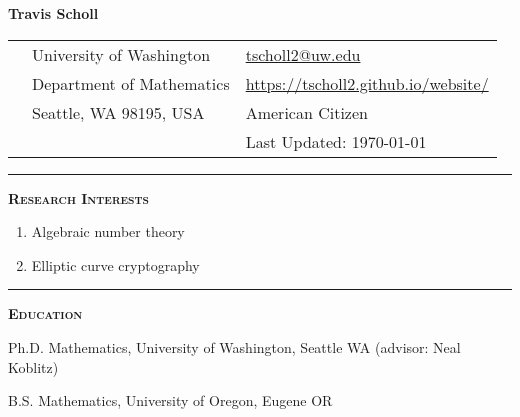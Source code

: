 \documentclass[12pt]{article}
\newcommand{\sectionheading}[1]
{
\bigskip %
\noindent
\hspace{-6.5mm}\textcolor{Gray}{\rule[.75mm]{21.5mm}{1mm}} %
\hspace{.2mm}	%
{\large{\textbf{\textsc{#1}}}} %
}
\newenvironment{date_section}
	{
	\vspace{-1ex}
	\leftmargini = 15ex
		\begin{itemize}[
			labelsep = *,
			labelwidth = 9ex,
			labelindent = 0ex,
			itemindent = !,
			font=\normalfont,
			align=parleft
		]{}
		\itemsep=-1.5mm
	}
	{\end{itemize}\vspace{-2ex}}
\newcommand{\yearmo}[2]{
	\item[
		{\makebox[1ex][r]{#1}}
		\hspace{1ex}
		{\makebox[1ex][l]{#2} }
		] }
\newcommand{\yearrange}[2]{
	\item[
		{\makebox[1ex][r]{#1}}
		--
		{\makebox[1ex][l]{#2} }
		] }
\begin{document}

	\thispagestyle{empty}

	\centerline{{\LARGE \textbf{Travis Scholl}}}

	\vspace{3mm}

	\begin{center}
		\begin{tabular}[c]{lll} %
			\phantom{aaaaaaaaa} %
			& University of Washington
				& \url{tscholl2@uw.edu} \\
 			& Department of Mathematics
				& \url{https://tscholl2.github.io/website/}\\
 			& Seattle, WA 98195, USA
	 			& American Citizen \\
			&
				& Last Updated: \today
		\end{tabular}
	\end{center}

	\sectionheading{Research Interests}%
	
	\vspace{1ex}
	
	\begin{enumerate}[label=$\bullet$]
		\item Algebraic number theory
		\item Elliptic curve cryptography
	\end{enumerate}

	\sectionheading{Education}%

		\begin{date_section}

			\yearmo{Expected}{2018} %
			Ph.D. Mathematics, University of Washington, Seattle WA (advisor: Neal Koblitz)

			\yearmo{}{2013} %
			B.S. Mathematics, University of Oregon, Eugene OR





		\end{date_section}
\end{document}
